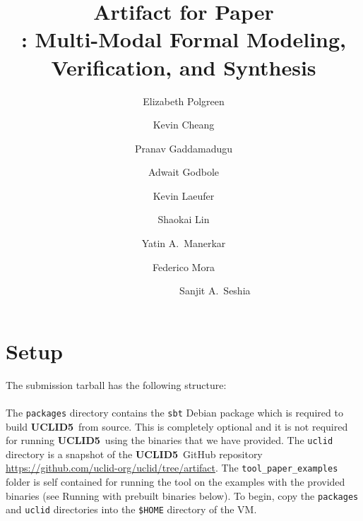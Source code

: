 \documentclass[runningheads]{llncs}
\begin{document}
%
\title{Artifact for Paper \\
\uclid: Multi-Modal Formal Modeling, Verification, and Synthesis}
%
\titlerunning{\uclid}
%
\author{Elizabeth Polgreen 
 \and 
Kevin Cheang
\and
Pranav Gaddamadugu
\and
Adwait Godbole 
\and
Kevin Laeufer
\and
Shaokai Lin
\and
Yatin A.~Manerkar
\and
Federico Mora
\and ~~~~~~~~~~~~
Sanjit A.~Seshia}
%


\maketitle

\newcommand{\artcommand}[1]{\texttt{#1}}
\newcommand{\uclidcmd}{\textbf{{UCLID5}}~}

\section{Setup}

The submission tarball has the following structure:

\paragraph{}
The \artcommand{packages} directory contains the \artcommand{sbt} Debian package which is required to build \uclidcmd from source. This is completely optional and it is not required for running \uclidcmd using the binaries that we have provided.
The \artcommand{uclid} directory is a snapshot of the \uclidcmd GitHub repository \url{https://github.com/uclid-org/uclid/tree/artifact}. The \artcommand{tool\_paper\_examples} folder is self contained for running the tool on the examples with the provided binaries (see Running with prebuilt binaries below).
To begin, copy the \artcommand{packages} and \artcommand{uclid} directories into the \artcommand{\$HOME} directory of the VM.
\end{document}
